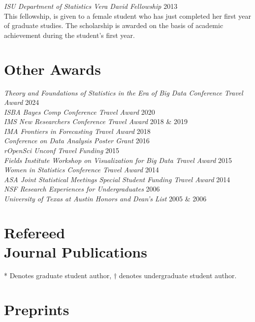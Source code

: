 \documentclass[margin,line]{res}
\begin{document}
\begin{resume}
{\em ISU Department of Statistics Vera David Fellowship } \hfill 2013\\
This fellowship, is given to a female student who has just completed her first year of graduate studies. The scholarship is awarded on the basis of academic achievement during the student’s first year.
% 


\section{\sc Other Awards}
{\em Theory and Foundations of Statistics in the Era of Big Data Conference Travel Award} \hfill 2024\\
{\em ISBA Bayes Comp Conference Travel Award} \hfill 2020 \\
{\em IMS New Researchers Conference Travel Award} \hfill 2018 \& 2019 \\
{\em IMA Frontiers in Forecasting Travel Award} \hfill 2018\\
{\em Conference on Data Analysis Poster Grant } \hfill 2016\\
{\em rOpenSci Unconf Travel Funding } \hfill 2015\\
{\em Fields Institute Workshop on Visualization for Big Data Travel Award } \hfill 2015\\
{\em Women in Statistics Conference Travel Award } \hfill 2014\\
{\em ASA Joint Statistical Meetings Special Student Funding Travel Award } \hfill 2014\\
{\em NSF Research Experiences for Undergraduates } \hfill 2006\\
{\em University of Texas at Austin Honors and Dean's List } \hfill 2005 \& 2006

\section{\sc Refereed \\ Journal Publications} 
* Denotes graduate student author, $\dagger$ denotes undergraduate student author. 
\printbibliography[keyword=refereed, heading=none, resetnumbers=true]

\section{\sc Preprints}
\printbibliography[keyword=submitted, heading=none, resetnumbers=false]


\end{resume}
\end{document}
